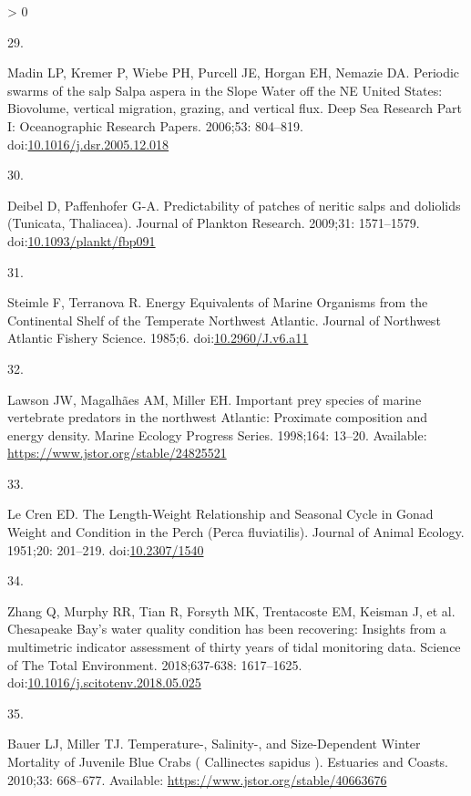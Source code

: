 \documentclass[
  10pt,
]{article}
\newlength{\cslhangindent}
\newlength{\csllabelwidth}
\newenvironment{CSLReferences}[2] %
 {%
  \setlength{\parindent}{0pt}
  \ifodd #1 \everypar{\setlength{\hangindent}{\cslhangindent}}\ignorespaces\fi
  \ifnum #2 > 0
  \setlength{\parskip}{#2\baselineskip}
  \fi
 }%
 {}
\newcommand{\CSLLeftMargin}[1]{\parbox[t]{\csllabelwidth}{#1}}
\newcommand{\CSLRightInline}[1]{\parbox[t]{\linewidth - \csllabelwidth}{#1}\break}
\begin{document}
\begin{CSLReferences}{0}{0}
\leavevmode\hypertarget{ref-madin_periodic_2006}{}%
\CSLLeftMargin{29. }
\CSLRightInline{Madin LP, Kremer P, Wiebe PH, Purcell JE, Horgan EH,
Nemazie DA. Periodic swarms of the salp {Salpa} aspera in the {Slope}
{Water} off the {NE} {United} {States}: {Biovolume}, vertical migration,
grazing, and vertical flux. Deep Sea Research Part I: Oceanographic
Research Papers. 2006;53: 804--819.
doi:\href{https://doi.org/10.1016/j.dsr.2005.12.018}{10.1016/j.dsr.2005.12.018}}

\leavevmode\hypertarget{ref-deibel_predictability_2009}{}%
\CSLLeftMargin{30. }
\CSLRightInline{Deibel D, Paffenhofer G-A. Predictability of patches of
neritic salps and doliolids ({Tunicata}, {Thaliacea}). Journal of
Plankton Research. 2009;31: 1571--1579.
doi:\href{https://doi.org/10.1093/plankt/fbp091}{10.1093/plankt/fbp091}}

\leavevmode\hypertarget{ref-steimle_energy_1985}{}%
\CSLLeftMargin{31. }
\CSLRightInline{Steimle F, Terranova R. Energy {Equivalents} of {Marine}
{Organisms} from the {Continental} {Shelf} of the {Temperate}
{Northwest} {Atlantic}. Journal of Northwest Atlantic Fishery Science.
1985;6. doi:\href{https://doi.org/10.2960/J.v6.a11}{10.2960/J.v6.a11}}

\leavevmode\hypertarget{ref-lawson_important_1998}{}%
\CSLLeftMargin{32. }
\CSLRightInline{Lawson JW, Magalhães AM, Miller EH. Important prey
species of marine vertebrate predators in the northwest {Atlantic}:
Proximate composition and energy density. Marine Ecology Progress
Series. 1998;164: 13--20. Available:
\url{https://www.jstor.org/stable/24825521}}

\leavevmode\hypertarget{ref-le_cren_length-weight_1951}{}%
\CSLLeftMargin{33. }
\CSLRightInline{Le Cren ED. The {Length}-{Weight} {Relationship} and
{Seasonal} {Cycle} in {Gonad} {Weight} and {Condition} in the {Perch}
({Perca} fluviatilis). Journal of Animal Ecology. 1951;20: 201--219.
doi:\href{https://doi.org/10.2307/1540}{10.2307/1540}}

\leavevmode\hypertarget{ref-zhang_chesapeake_2018}{}%
\CSLLeftMargin{34. }
\CSLRightInline{Zhang Q, Murphy RR, Tian R, Forsyth MK, Trentacoste EM,
Keisman J, et al. Chesapeake {Bay}'s water quality condition has been
recovering: {Insights} from a multimetric indicator assessment of thirty
years of tidal monitoring data. Science of The Total Environment.
2018;637-638: 1617--1625.
doi:\href{https://doi.org/10.1016/j.scitotenv.2018.05.025}{10.1016/j.scitotenv.2018.05.025}}

\leavevmode\hypertarget{ref-bauer_temperature-_2010}{}%
\CSLLeftMargin{35. }
\CSLRightInline{Bauer LJ, Miller TJ. Temperature-, {Salinity}-, and
{Size}-{Dependent} {Winter} {Mortality} of {Juvenile} {Blue} {Crabs} (
{Callinectes} sapidus ). Estuaries and Coasts. 2010;33: 668--677.
Available: \url{https://www.jstor.org/stable/40663676}}


\end{CSLReferences}
\end{document}
